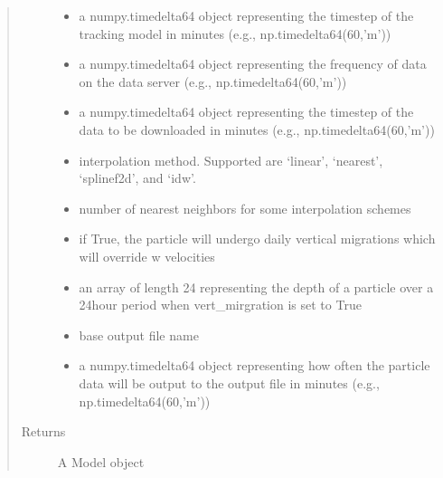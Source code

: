\documentclass[letterpaper,10pt,english]{sphinxmanual}
\begin{document}
\begin{fulllineitems}
\begin{quote}
\begin{description}
\begin{itemize}
\item {} 
\sphinxAtStartPar
{} \textendash{} a numpy.timedelta64 object representing the timestep of the tracking
model in minutes (e.g., np.timedelta64(60,’m’))

\item {} 
\sphinxAtStartPar
{} \textendash{} a numpy.timedelta64 object representing the frequency of data on the
data server (e.g., np.timedelta64(60,’m’))

\item {} 
\sphinxAtStartPar
{} \textendash{} a numpy.timedelta64 object representing the timestep of the data to be
downloaded in minutes (e.g., np.timedelta64(60,’m’))

\item {} 
\sphinxAtStartPar
{} \textendash{} interpolation method. Supported are ‘linear’, ‘nearest’, ‘splinef2d’,
and ‘idw’.

\item {} 
\sphinxAtStartPar
{} \textendash{} number of nearest neighbors for some interpolation schemes

\item {} 
\sphinxAtStartPar
{} \textendash{} if True, the particle will undergo daily vertical migrations which will
override w velocities

\item {} 
\sphinxAtStartPar
{} \textendash{} an array of length 24 representing the depth of a particle over a
24\sphinxhyphen{}hour period when vert\_mirgration is set to True

\item {} 
\sphinxAtStartPar
{} \textendash{} base output file name

\item {} 
\sphinxAtStartPar
{} \textendash{} a numpy.timedelta64 object representing how often the particle data will
be output to the output file in minutes (e.g., np.timedelta64(60,’m’))

\end{itemize}

\item[{Returns}] \leavevmode
\sphinxAtStartPar
A Model object


\end{description}
\end{quote}
\end{fulllineitems}
\end{document}
